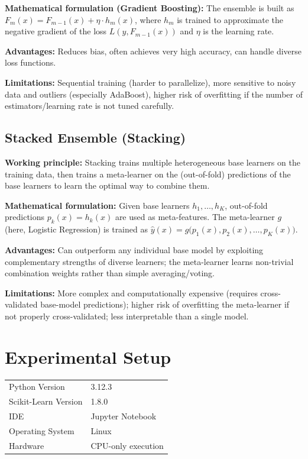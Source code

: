 \documentclass[12pt,a4paper]{article}
\begin{document}
\textbf{Mathematical formulation (Gradient Boosting):} The ensemble is built as
$F_m(x) = F_{m-1}(x) + \eta \cdot h_m(x)$, where $h_m$ is trained to approximate the negative
gradient of the loss $L(y, F_{m-1}(x))$ and $\eta$ is the learning rate.

\textbf{Advantages:} Reduces bias, often achieves very high accuracy, can handle diverse loss
functions.

\textbf{Limitations:} Sequential training (harder to parallelize), more sensitive to noisy data
and outliers (especially AdaBoost), higher risk of overfitting if the number of estimators/learning
rate is not tuned carefully.

\subsection*{Stacked Ensemble (Stacking)}
\textbf{Working principle:} Stacking trains multiple heterogeneous base learners on the training
data, then trains a meta-learner on the (out-of-fold) predictions of the base learners to learn
the optimal way to combine them.

\textbf{Mathematical formulation:} Given base learners $h_1, \ldots, h_K$, out-of-fold
predictions $p_k(x) = h_k(x)$ are used as meta-features. The meta-learner $g$ (here, Logistic
Regression) is trained as
$\hat{y}(x) = g\big(p_1(x), p_2(x), \ldots, p_K(x)\big)$.

\textbf{Advantages:} Can outperform any individual base model by exploiting complementary
strengths of diverse learners; the meta-learner learns non-trivial combination weights rather
than simple averaging/voting.

\textbf{Limitations:} More complex and computationally expensive (requires cross-validated
base-model predictions); higher risk of overfitting the meta-learner if not properly
cross-validated; less interpretable than a single model.

\section{Experimental Setup}
\begin{tabular}{ll}
\toprule
Python Version & 3.12.3 \\
Scikit-Learn Version & 1.8.0 \\
IDE & Jupyter Notebook \\
Operating System & Linux \\
Hardware & CPU-only execution \\
\bottomrule
\end{tabular}
\end{document}
